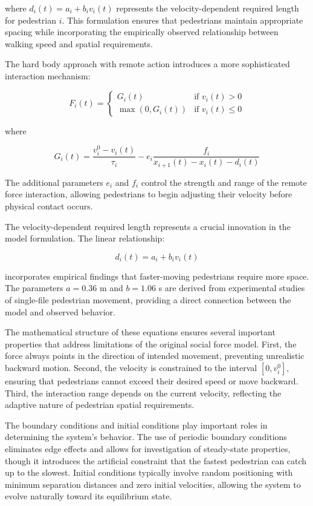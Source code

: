 \documentclass[12pt,a4paper]{article}
\begin{document}
where $d_i(t) = a_i + b_i v_i(t)$ represents the velocity-dependent required length for pedestrian $i$. This formulation ensures that pedestrians maintain appropriate spacing while incorporating the empirically observed relationship between walking speed and spatial requirements.

The hard body approach with remote action introduces a more sophisticated interaction mechanism:

\begin{equation}
F_i(t) = \begin{cases}
G_i(t) & \text{if } v_i(t) > 0 \\
\max(0, G_i(t)) & \text{if } v_i(t) \leq 0
\end{cases}
\end{equation}

where

\begin{equation}
G_i(t) = \frac{v_i^0 - v_i(t)}{\tau_i} - e_i \frac{f_i}{x_{i+1}(t) - x_i(t) - d_i(t)}
\end{equation}

The additional parameters $e_i$ and $f_i$ control the strength and range of the remote force interaction, allowing pedestrians to begin adjusting their velocity before physical contact occurs.

The velocity-dependent required length represents a crucial innovation in the model formulation. The linear relationship:

\begin{equation}
d_i(t) = a_i + b_i v_i(t)
\end{equation}

incorporates empirical findings that faster-moving pedestrians require more space. The parameters $a = 0.36$ m and $b = 1.06$ s are derived from experimental studies of single-file pedestrian movement, providing a direct connection between the model and observed behavior.

The mathematical structure of these equations ensures several important properties that address limitations of the original social force model. First, the force always points in the direction of intended movement, preventing unrealistic backward motion. Second, the velocity is constrained to the interval $[0, v_i^0]$, ensuring that pedestrians cannot exceed their desired speed or move backward. Third, the interaction range depends on the current velocity, reflecting the adaptive nature of pedestrian spatial requirements.

The boundary conditions and initial conditions play important roles in determining the system's behavior. The use of periodic boundary conditions eliminates edge effects and allows for investigation of steady-state properties, though it introduces the artificial constraint that the fastest pedestrian can catch up to the slowest. Initial conditions typically involve random positioning with minimum separation distances and zero initial velocities, allowing the system to evolve naturally toward its equilibrium state.
\end{document}
